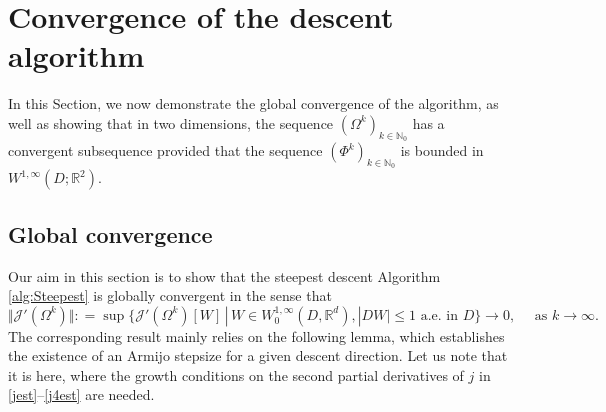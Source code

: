 \documentclass[a4paper,10pt]{article}
\theoremstyle{plain}
\theoremstyle{plain}
\numberwithin{equation}{section}
\newcommand{\R}{\mathbb{R}}
\begin{document}
\section{Convergence of the descent algorithm}\label{sec:convergenceOfAlgorithm}
In this Section, we now demonstrate the global convergence of the algorithm, as well as showing that in two dimensions, the sequence $(\Omega^k)_{k \in \mathbb{N}_0}$ has a convergent subsequence provided that the sequence $(\Phi^k)_{k \in \mathbb{N}_0}$ is bounded in $W^{1,\infty}(D;\R^2)$.

\subsection{Global convergence}
\noindent
Our aim in this section is to  show that the steepest descent Algorithm \ref{alg:Steepest} is globally convergent in the sense that
\begin{displaymath}
\Vert \mathcal J'(\Omega^k) \Vert: = \sup \lbrace \mathcal J'(\Omega^k)[W] \, | \, W \in W^{1,\infty}_0(D, \mathbb R^d), | DW | \leq 1 \mbox{ a.e. in } D \rbrace \rightarrow 0, \quad \mbox{ as }
k \rightarrow \infty.
\end{displaymath}
The corresponding result mainly relies on the following lemma,
which establishes the existence of an Armijo stepsize for a 
given descent direction. Let us note that it is here, where
the growth conditions  on the second partial derivatives of $j$ in \eqref{jest}--\eqref{j4est} are needed. 
\end{document}
